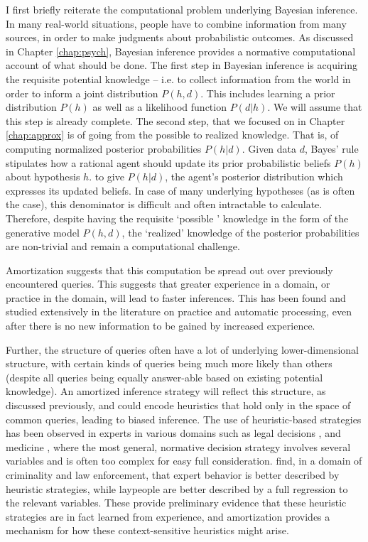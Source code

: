 I first briefly reiterate the computational problem underlying Bayesian inference. In many real-world situations, people have to combine information from many sources, in order to make judgments about probabilistic outcomes. As discussed in Chapter \ref{chap:psych}, Bayesian inference provides a normative computational account of what should be done. The first step in Bayesian inference is acquiring the requisite potential knowledge  -- i.e. to collect information from the world in order to inform a joint distribution $P(h,d)$. This includes learning a prior distribution $P(h)$ as well as a likelihood function $P(d | h)$. We will assume that this step is already complete. The second step, that we focused on in Chapter \ref{chap:approx} is of going from the possible to realized knowledge. That is, of computing normalized posterior probabilities  $P(h |d)$. Given data $d$, Bayes' rule stipulates how a rational agent should update its prior probabilistic beliefs $P(h)$ about hypothesis $h$.
to give $P(h|d)$, the agent's posterior distribution which expresses its updated beliefs. In case of many underlying hypotheses (as is often the case), this denominator is difficult and often intractable to calculate. Therefore, despite having the requisite `possible ' knowledge in the form of the generative model $P(h,d)$, the `realized' knowledge of the posterior probabilities are non-trivial and remain a computational challenge.

Amortization suggests that this computation be spread out over previously encountered queries. This suggests that greater experience in a domain, or practice in the domain, will lead to faster inferences. This has been found and studied extensively in the literature on practice\citep{gobet2001chunking, newell1981mechanisms} and automatic processing\citep{shiffrin1977controlled, logan1988toward}, even after there is no new information to be gained by increased experience. 

Further, the structure of queries often have a lot of underlying lower-dimensional structure, with certain kinds of queries being much more likely than others (despite all queries being equally answer-able based on existing potential knowledge). An amortized inference strategy will reflect this structure, as discussed previously, and could encode heuristics that hold only in the space of common queries, leading to biased inference. The use of heuristic-based strategies has been observed in experts in various domains such as legal decisions \citep{dhami2001bailing}, and medicine \citep{reyna2006physician}, where the most general, normative decision strategy involves several variables and is often too complex for easy full consideration. \cite{garcia2009take} find, in a domain of criminality and law enforcement, that expert behavior is better described by heuristic strategies, while laypeople are better described by a full regression to the relevant variables. These provide preliminary evidence that these heuristic strategies are in fact learned from experience, and amortization provides a mechanism for how these context-sensitive heuristics might arise.

